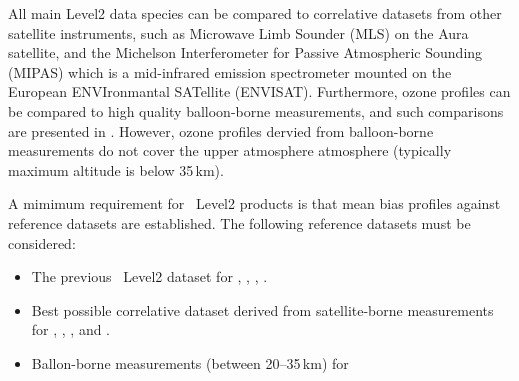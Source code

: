 All main Level2 data species can be compared to correlative datasets
from other satellite instruments, such as Microwave Limb Sounder (MLS)
on the Aura satellite, and the Michelson Interferometer for Passive
Atmospheric Sounding (MIPAS) which is a mid-infrared emission spectrometer
mounted on the European ENVIronmantal SATellite (ENVISAT).
Furthermore, \smr ozone profiles can be compared to high quality balloon-borne 
measurements, and such comparisons are presented in \citep{jegou:techn:08}.
However, ozone profiles dervied from balloon-borne 
measurements do not cover the upper atmosphere atmosphere (typically maximum
altitude is below 35\,km).

A mimimum requirement for \smr\ Level2 products is that mean bias 
profiles against reference datasets are established. 
The following reference datasets must be considered:
\begin{itemize}

\item The previous \smr\ Level2 dataset for , , , .

\item Best possible correlative dataset derived from satellite-borne measurements
      for , , , and .

\item Ballon-borne measurements (between 20--35\,km) for 

\end{itemize}



 
